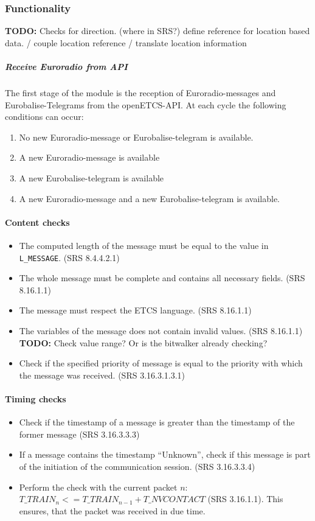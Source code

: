 \documentclass{template/openetcs_report}
\begin{document}
\subsubsection{Functionality}

\textbf{TODO:} Checks for direction. (where in SRS?) define reference for location based data. / couple location reference / translate location information
\subparagraph{Receive Euroradio from API}
The first stage of the module is the reception of Euroradio-messages and Eurobalise-Telegrams from the openETCS-API. At each cycle the following conditions can occur:
\begin{enumerate}
 \item No new Euroradio-message or Eurobalise-telegram is available.
 \item A new Euroradio-message is available
 \item A new Eurobalise-telegram is available
 \item A new Euroradio-message and a new Eurobalise-telegram is available.
\end{enumerate}

\paragraph{Content checks}
\begin{itemize}
 \item The computed length of the message must be equal to the value in \texttt{L\_MESSAGE}. (SRS 8.4.4.2.1)
 \item The whole message must be complete and contains all necessary fields. (SRS 8.16.1.1)
 \item The message must respect the ETCS language. (SRS 8.16.1.1)
 \item The variables of the message does not contain invalid values. (SRS 8.16.1.1) \\\textbf{TODO:} Check value range? Or is the bitwalker already checking?
 \item Check if the specified priority of message is equal to the priority with which the message was received. (SRS 3.16.3.1.3.1)
\end{itemize}


\paragraph{Timing checks}
\begin{itemize}
 \item Check if the timestamp of a message is greater than the timestamp of the former message (SRS 3.16.3.3.3)
 \item If a message contains the timestamp ``Unknown'', check if this message is part of the initiation of the communication session. (SRS 3.16.3.3.4)
 \item Perform the check with the current packet $n$:  $T\_TRAIN_{n} <= T\_TRAIN_{n-1} + T\_NVCONTACT$ (SRS 3.16.1.1). This ensures, that the packet was received in due time.
\end{itemize}
\end{document}
